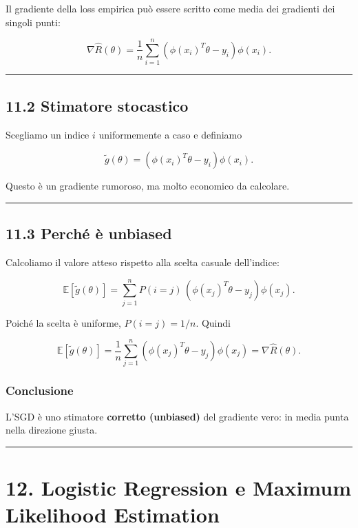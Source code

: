 \documentclass{article}
\begin{document}
Il gradiente della loss empirica può essere scritto come media dei
gradienti dei singoli punti:

\[
\nabla \hat R(\theta)
=
\frac{1}{n}\sum_{i=1}^n (\phi(x_i)^T\theta - y_i)\phi(x_i).
\]

\begin{center}\rule{0.5\linewidth}{0.5pt}\end{center}

\subsection{11.2 Stimatore stocastico}\label{stimatore-stocastico}

Scegliamo un indice \(i\) uniformemente a caso e definiamo

\[
\tilde g(\theta)
=
(\phi(x_i)^T\theta-y_i)\phi(x_i).
\]

Questo è un gradiente rumoroso, ma molto economico da calcolare.

\begin{center}\rule{0.5\linewidth}{0.5pt}\end{center}

\subsection{11.3 Perché è unbiased}\label{perchuxe9-uxe8-unbiased}

Calcoliamo il valore atteso rispetto alla scelta casuale dell'indice:

\[
\mathbb{E}[\tilde g(\theta)]
=
\sum_{j=1}^n P(i=j)\,(\phi(x_j)^T\theta-y_j)\phi(x_j).
\]

Poiché la scelta è uniforme, \(P(i=j)=1/n\). Quindi

\[
\mathbb{E}[\tilde g(\theta)]
=
\frac{1}{n}\sum_{j=1}^n (\phi(x_j)^T\theta-y_j)\phi(x_j)
=
\nabla \hat R(\theta).
\]

\subsubsection{Conclusione}\label{conclusione-6}

L'SGD è uno stimatore \textbf{corretto (unbiased)} del gradiente vero:
in media punta nella direzione giusta.

\begin{center}\rule{0.5\linewidth}{0.5pt}\end{center}

\section{12. Logistic Regression e Maximum Likelihood
Estimation}\label{logistic-regression-e-maximum-likelihood-estimation}
\end{document}
